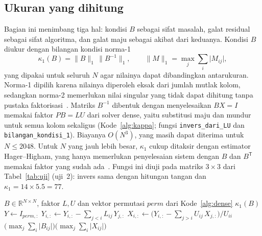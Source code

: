 \documentclass[12pt,a4paper]{article}
\newcommand{\R}{\mathbb{R}}
\newcommand{\T}{\mathsf{T}}
\numberwithin{equation}{section}
\begin{document}
\subsection{Ukuran yang dihitung}
Bagian ini menimbang tiga hal: kondisi $B$ sebagai sifat masalah, galat residual sebagai sifat algoritma, dan galat
maju sebagai akibat dari keduanya. Kondisi $B$ diukur dengan bilangan kondisi norma-1
\begin{equation}\label{eq:kappa}
\kappa_1(B)=\lVert B\rVert_1\,\lVert B^{-1}\rVert_1,\qquad
\lVert M\rVert_1=\max_{j}\sum_{i}\lvert M_{ij}\rvert,
\end{equation}
yang dipakai untuk seluruh $N$ agar nilainya dapat dibandingkan antarukuran. Norma-1 dipilih karena nilainya
diperoleh eksak dari jumlah mutlak kolom, sedangkan norma-2 memerlukan nilai singular yang tidak dapat dihitung tanpa
pustaka faktorisasi~\cite{heath}. Matriks $B^{-1}$ dibentuk dengan menyelesaikan $BX=I$ memakai faktor $PB=LU$ dari
solver dense, yaitu substitusi maju dan mundur untuk semua kolom sekaligus (Kode~\ref{alg:kappa}; fungsi
\texttt{invers\_dari\_LU} dan \texttt{bilangan\_kondisi\_1}). Biayanya $O(N^3)$, yang masih dapat diterima untuk
$N\le2048$. Untuk $N$ yang jauh lebih besar, $\kappa_1$ cukup ditaksir dengan estimator Hager--Higham, yang hanya
memerlukan penyelesaian sistem dengan $B$ dan $B^\T$ memakai faktor yang sudah ada~\cite{higham}. Fungsi ini diuji
pada matriks $3\times3$ dari Tabel~\ref{tab:uji} (uji~2): invers sama dengan hitungan tangan dan
$\kappa_1=14\times5.5=77$.

\begin{algorithm}[H]
\caption{Bilangan kondisi $\kappa_1(B)$ dari faktor $PB=LU$}
\label{alg:kappa}
\begin{algorithmic}[1]
\Require $B\in\R^{N\times N}$, faktor $L,U$ dan vektor permutasi $\mathit{perm}$ dari Kode~\ref{alg:dense}
\Ensure $\kappa_1(B)$
\State $Y\gets I_{\mathit{perm},:}$ 
 
  \State $Y_{i,:}\gets Y_{i,:}-\sum_{j<i}L_{ij}\,Y_{j,:}$
\EndFor
{} 
  \State $X_{i,:}\gets\bigl(Y_{i,:}-\sum_{j>i}U_{ij}\,X_{j,:}\bigr)/U_{ii}$
\EndFor
\State \Return $\bigl(\max_j\sum_i\lvert B_{ij}\rvert\bigr)\bigl(\max_j\sum_i\lvert X_{ij}\rvert\bigr)$
\end{algorithmic}
\end{algorithm}
\end{document}
